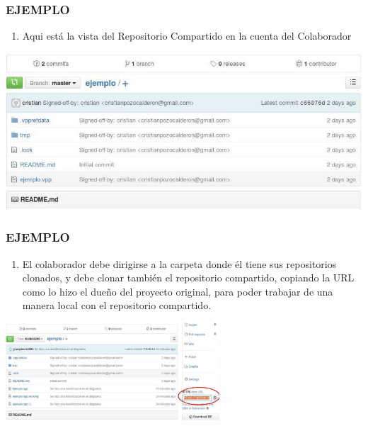 \documentclass[8pt]{beamer}
\begin{document}
\begin{frame}
\frametitle{EJEMPLO}
\begin{enumerate}[17. ]
    \item  Aqui está la vista del Repositorio Compartido en la cuenta del Colaborador\\
\end{enumerate}
\begin{center}
\includegraphics[width=9 cm]{img/b27}\\
\fontsize{6}{1}
\end{center}
\end{frame}

\begin{frame}
\frametitle{EJEMPLO}
\begin{enumerate}[18. ]
	\justifying
    \item  El colaborador debe dirigirse a la carpeta donde él tiene sus repositorios clonados, y debe clonar también el repositorio compartido, copiando la URL como lo hizo el dueño del proyecto original, para poder trabajar de una manera local con el repositorio compartido.\\
\end{enumerate}
\begin{center}
\includegraphics[width=8cm]{img/b29}\\
\fontsize{6}{1}
\end{center}
\end{frame}
\end{document}
